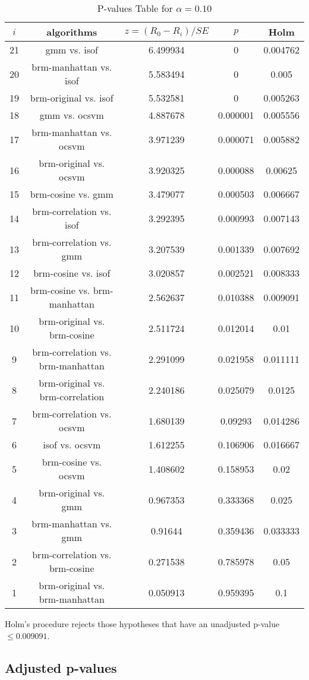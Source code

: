 \documentclass[a4paper,10pt]{article}
\begin{document}
\begin{landscape}
\begin{table}[!htp]
\centering\scriptsize
\begin{tabular}{ccccc}
$i$&algorithms&$z=(R_0 - R_i)/SE$&$p$&Holm\\
\hline21&gmm vs. isof&6.499934&0&0.004762\\
20&brm-manhattan vs. isof&5.583494&0&0.005\\
19&brm-original vs. isof&5.532581&0&0.005263\\
18&gmm vs. ocsvm&4.887678&0.000001&0.005556\\
17&brm-manhattan vs. ocsvm&3.971239&0.000071&0.005882\\
16&brm-original vs. ocsvm&3.920325&0.000088&0.00625\\
15&brm-cosine vs. gmm&3.479077&0.000503&0.006667\\
14&brm-correlation vs. isof&3.292395&0.000993&0.007143\\
13&brm-correlation vs. gmm&3.207539&0.001339&0.007692\\
12&brm-cosine vs. isof&3.020857&0.002521&0.008333\\
11&brm-cosine vs. brm-manhattan&2.562637&0.010388&0.009091\\
10&brm-original vs. brm-cosine&2.511724&0.012014&0.01\\
9&brm-correlation vs. brm-manhattan&2.291099&0.021958&0.011111\\
8&brm-original vs. brm-correlation&2.240186&0.025079&0.0125\\
7&brm-correlation vs. ocsvm&1.680139&0.09293&0.014286\\
6&isof vs. ocsvm&1.612255&0.106906&0.016667\\
5&brm-cosine vs. ocsvm&1.408602&0.158953&0.02\\
4&brm-original vs. gmm&0.967353&0.333368&0.025\\
3&brm-manhattan vs. gmm&0.91644&0.359436&0.033333\\
2&brm-correlation vs. brm-cosine&0.271538&0.785978&0.05\\
1&brm-original vs. brm-manhattan&0.050913&0.959395&0.1\\
\hline
\end{tabular}
\caption{P-values Table for $\alpha=0.10$}
\end{table}Holm's procedure rejects those hypotheses that have an unadjusted p-value $\le0.009091$.

\pagebreak

\subsection{Adjusted p-values}


\end{landscape}
\end{document}
